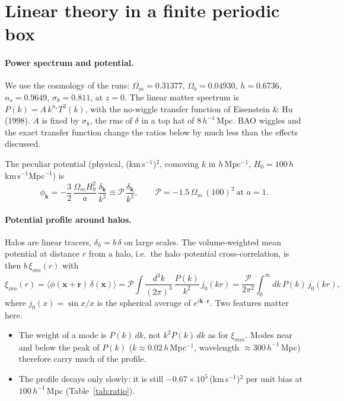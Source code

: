 \documentclass[11pt,a4paper]{article}
\newcommand{\kms}{(km\,s$^{-1}$)$^2$}
\newcommand{\Mpch}{$h^{-1}$\,Mpc}
\begin{document}
\section{Linear theory in a finite periodic box}
\label{sec:theory}

\paragraph{Power spectrum and potential.}
We use the cosmology of the runs: $\Omega_m=0.31377$, $\Omega_b=0.04930$, $h=0.6736$, $n_s=0.9649$,
$\sigma_8=0.811$, at $z=0$. The linear matter spectrum is $P(k)=A\,k^{n_s}T^2(k)$, with the no-wiggle transfer
function of Eisenstein \& Hu (1998). $A$ is fixed by $\sigma_8$, the rms of $\delta$ in a top hat of $8$\,\Mpch. BAO
wiggles and the exact transfer function change the ratios below by much less than the effects discussed.

The peculiar potential (physical, \kms{}, comoving $k$ in $h$\,Mpc$^{-1}$, $H_0=100\,h$\,km\,s$^{-1}$Mpc$^{-1}$) is
\begin{equation}
  \phi_{\boldsymbol k} = -\frac{3}{2}\,\frac{\Omega_m H_0^2}{a}\,\frac{\delta_{\boldsymbol k}}{k^2}
  \equiv \mathcal{P}\,\frac{\delta_{\boldsymbol k}}{k^2},
  \qquad \mathcal{P} = -1.5\,\Omega_m\,(100)^2\ \text{at } a=1 .
\end{equation}

\paragraph{Potential profile around halos.}
Halos are linear tracers, $\delta_h=b\,\delta$ on large scales. The volume-weighted mean potential at distance $r$
from a halo, i.e.\ the halo--potential cross-correlation, is then $b\,\xi_{\phi m}(r)$ with
\begin{equation}
  \xi_{\phi m}(r) = \langle \phi(\boldsymbol x+\boldsymbol r)\,\delta(\boldsymbol x)\rangle
  = \mathcal{P}\int\!\frac{d^3k}{(2\pi)^3}\,\frac{P(k)}{k^2}\,j_0(kr)
  = \frac{\mathcal{P}}{2\pi^2}\int_0^\infty\! dk\,P(k)\,j_0(kr),
  \label{eq:prof}
\end{equation}
where $j_0(x)=\sin x/x$ is the spherical average of $e^{i\boldsymbol k\cdot\boldsymbol r}$. Two features matter
here.
\begin{itemize}
\item The weight of a mode is $P(k)\,dk$, not $k^2P(k)\,dk$ as for $\xi_{mm}$. Modes near and below the peak of
  $P(k)$ ($k\approx0.02$\,$h$\,Mpc$^{-1}$, wavelength $\approx300$\,\Mpch) therefore carry much of the profile.
\item The profile decays only slowly: it is still $-0.67\times10^5$\,\kms{} per unit bias at $100$\,\Mpch{}
  (Table~\ref{tab:ratio}).
\end{itemize}
\end{document}
